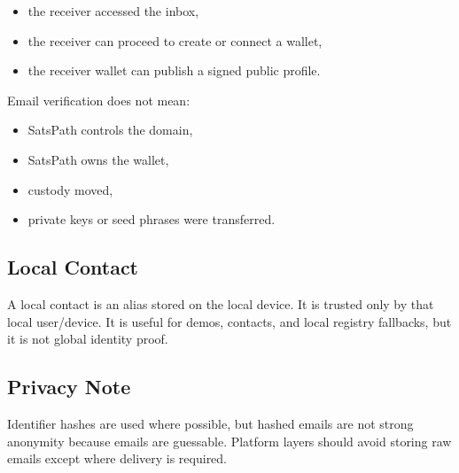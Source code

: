 \documentclass[
]{article}
\providecommand{\tightlist}{%
  \setlength{\itemsep}{0pt}\setlength{\parskip}{0pt}}
\begin{document}
\begin{itemize}
\tightlist
\item
  the receiver accessed the inbox,
\item
  the receiver can proceed to create or connect a wallet,
\item
  the receiver wallet can publish a signed public profile.
\end{itemize}

Email verification does not mean:

\begin{itemize}
\tightlist
\item
  SatsPath controls the domain,
\item
  SatsPath owns the wallet,
\item
  custody moved,
\item
  private keys or seed phrases were transferred.
\end{itemize}

\hypertarget{local-contact}{%
\subsection{Local Contact}\label{local-contact}}

A local contact is an alias stored on the local device. It is trusted
only by that local user/device. It is useful for demos, contacts, and
local registry fallbacks, but it is not global identity proof.

\hypertarget{privacy-note}{%
\subsection{Privacy Note}\label{privacy-note}}

Identifier hashes are used where possible, but hashed emails are not
strong anonymity because emails are guessable. Platform layers should
avoid storing raw emails except where delivery is required.
\end{document}
